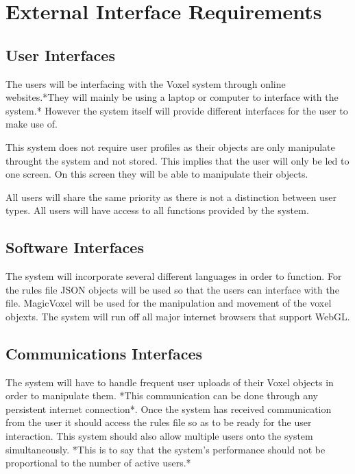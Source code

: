 \documentclass[english]{article}
\begin{document}
	\pagebreak
	
	\section{External Interface Requirements}
	
		\subsection{User Interfaces}
		The users will be interfacing with the Voxel system through online websites.*They will mainly be using a laptop or
		computer to interface with the system.* However the system itself will provide different interfaces for the user to make
		use of.
		
		This system does not require user profiles as their objects are only manipulate throught the system and not stored. This 
		implies that the user will only be led to one screen. On this screen they will be able to manipulate their objects.
		
		All users will share the same priority as there is not a distinction between user types. All users will have access to 
		all functions provided by the system.
		
		\subsection{Software Interfaces}
		The system will incorporate several different languages in order to function. For the rules file JSON objects will be 
		used so that the users can interface with the file. MagicVoxel will be used for the manipulation and movement of the 
		voxel objexts. The system will run off all major internet browsers that support WebGL.
		
		\subsection{Communications Interfaces}
		The system will have to handle frequent user uploads of their Voxel objects in order to manipulate them. *This
		communication can be done through any persistent internet connection*. Once the system has received communication from 
		the user it should access the rules file so as to be ready for the user interaction. This system should also allow 
		multiple users onto the system simultaneously. *This is to say that the system's performance should not be proportional 
		to the number of active users.*
		
	\pagebreak
	
\end{document}
